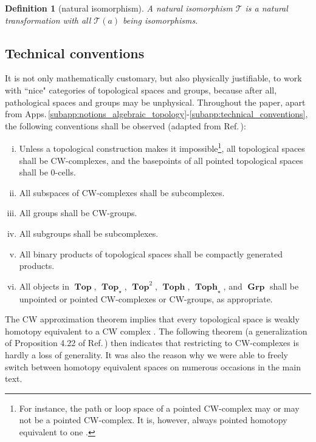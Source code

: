 \documentclass[sort&compress]{elsarticle}
\theoremstyle{theoremstyle}
\theoremstyle{framedtheoremstyle}
\theoremstyle{definitionstyle}
\newtheorem{dfn}[nul]{Definition}%
\theoremstyle{definitionstyle}
\theoremstyle{definitionstyle}
\theoremstyle{definitionstyle}
\theoremstyle{nameddefinitionstyle}
\theoremstyle{framednameddefinitionstyle}
\theoremstyle{proofstyle}
\theoremstyle{definitionstyle}
\newcommand{\T}{\mathcal{T}}
\newcommand{\Top}{\operatorname{\mathbf{Top}}}
\newcommand{\Toph}{\operatorname{\mathbf{Toph}}}
\newcommand{\Grp}{\operatorname{\mathbf{Grp}}}
\begin{document}
\begin{appendices}
\begin{dfn}[natural isomorphism]
A natural isomorphism $\T$ is a natural transformation with all $\T(a)$ being isomorphisms.
\end{dfn}





\subsection{Technical conventions\label{subapp:technical_conventions}}

It is not only mathematically customary, but also physically justifiable, to work with ``nice" categories of topological spaces and groups, because after all, pathological spaces and groups may be unphysical. Throughout the paper, apart from Apps.\,\ref{subapp:notions_algebraic_topology}-\ref{subapp:technical_conventions}, the following conventions shall be observed (adapted from Ref.\,\cite{AdemMilgram}):
\begin{enumerate}[(i)]
\item Unless a topological construction makes it impossible\footnote{For instance, the path or loop space of a pointed CW-complex may or may not be a pointed CW-complex. It is, however, always pointed homotopy equivalent to one \cite{Milnor1959}.}, all topological spaces shall be CW-complexes, and the basepoints of all pointed topological spaces shall be $0$-cells.

\item All subspaces of CW-complexes shall be subcomplexes.

\item All groups shall be CW-groups.

\item All subgroups shall be subcomplexes.

\item All binary products of topological spaces shall be compactly generated products.

\item All objects in $\Top$, $\Top_\star$, $\Top^2$, $\Toph$, $\Toph_\star$, and $\Grp$ shall be unpointed or pointed CW-complexes or CW-groups, as appropriate.
\end{enumerate}

The CW approximation theorem implies that every topological space is weakly homotopy equivalent to a CW complex \cite{Hatcher}. The following theorem (a generalization of Proposition 4.22 of Ref.\,\cite{Hatcher}) then indicates that restricting to CW-complexes is hardly a loss of generality. It was also the reason why we were able to freely switch between homotopy equivalent spaces on numerous occasions in the main text.


\end{appendices}
\end{document}
